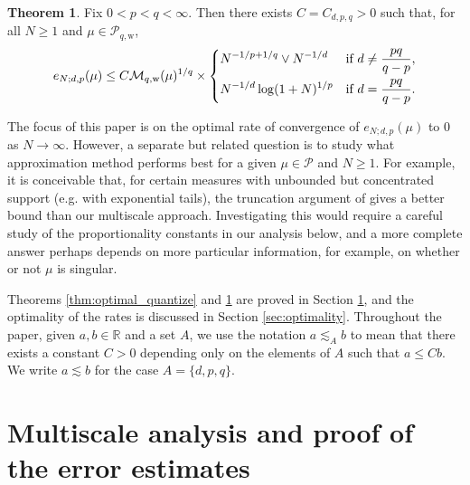 \documentclass[11pt,reqno]{amsart}
\theoremstyle{definition}
\newcommand{\weak}{{\mathrm{w}}}
\newcommand{\RR}{{\mathbb R}}
\newcommand{\mcl}{\mathcal}
\newtheorem{theorem}{Theorem}
\theoremstyle{definition}
\numberwithin{equation}{section}
\numberwithin{lemma}{section}
\numberwithin{proposition}{section}
\numberwithin{theorem}{section}
\numberwithin{corollary}{section}
\numberwithin{definition}{section}
\numberwithin{remark}{section}
\begin{document}
\begin{theorem}\label{thm:optimal_quantize_weak}
	   Fix $0 < p < q < \infty$. Then there exists $C = C_{d,p,q} > 0$ such that, for all $N \ge 1$ and $\mu \in \mcl P_{q,\weak}$,
	\[
		e_{N;d,p}(\mu)
		\le C \mcl M_{q,\weak}(\mu)^{1/q} \times
		\begin{dcases}
			N^{-1/p + 1/q} \vee N^{-1/d} & \text{if } d \ne \frac{pq}{q-p},\\
			N^{-1/d} \log(1+N)^{1/p} & \text{if } d = \frac{pq}{q-p}.
		\end{dcases}
	\]
\end{theorem}

The focus of this paper is on the optimal rate of convergence of $e_{N;d,p}(\mu)$ to $0$ as $N \to \infty$. However, a separate but related question is to study what approximation method performs best for a given $\mu \in \mcl P$ and $N \ge 1$. For example, it is conceivable that, for certain measures with unbounded but concentrated support (e.g. with exponential tails), the truncation argument of \cite{Chev} gives a better bound than our multiscale approach. Investigating this would require a careful study of the proportionality constants in our analysis below, and a more complete answer perhaps depends on more particular information, for example, on whether or not $\mu$ is singular. 

Theorems \ref{thm:optimal_quantize} and \ref{thm:optimal_quantize_weak} are proved in Section \ref{sec:proof}, and the optimality of the rates is discussed in Section \ref{sec:optimality}. Throughout the paper, given $a,b \in \RR$ and a set $A$, we use the notation $a \lesssim_A b$ to mean that there exists a constant $C > 0$ depending only on the elements of $A$ such that $a \le Cb$. We write $a \lesssim b$ for the case $A = \{ d,p,q\}$.

\section{Multiscale analysis and proof of the error estimates}\label{sec:proof}
\end{document}
